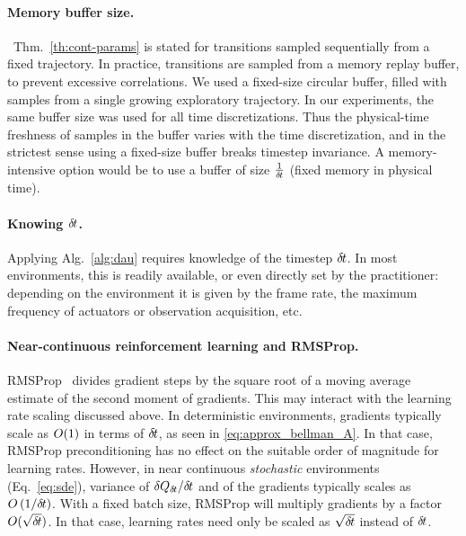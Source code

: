 \paragraph{Memory buffer size.}~Thm.~\ref{th:cont-params} is stated for
transitions sampled sequentially from a fixed trajectory. In practice,
transitions are sampled from a memory replay buffer, to prevent excessive correlations.
We used a fixed-size circular buffer, filled
with samples from a single growing exploratory trajectory. In
our experiments, the same buffer size was used for all time discretizations. 
Thus the physical-time freshness of samples in the buffer varies with the
time discretization, and in the strictest sense using a fixed-size buffer
breaks timestep invariance. A memory-intensive option would be to use a
buffer of size $\frac{1}{{\delta\hspace{-.1em}t}}$ (fixed memory in physical time).

\paragraph{Knowing ${\delta\hspace{-.1em}t}$.} Applying Alg.~\ref{alg:dau} requires
knowledge of the timestep ${\delta\hspace{-.1em}t}$. In most environments, this is
readily available, or even directly set by the practitioner: depending on
the environment it is given by the frame rate, the maximum frequency of
actuators or observation acquisition, etc. 

\paragraph{Near-continuous reinforcement learning and RMSProp.}
RMSProp~\cite{rmsprop} divides gradient steps by the square root of a
moving average estimate of the second moment of gradients.
This may interact with the learning rate scaling discussed above. In
deterministic environments, gradients typically scale as $O(1)$ in
terms of ${\delta\hspace{-.1em}t}$, as seen in \eqref{eq:approx_bellman_A}.  In that case, RMSProp
preconditioning has no effect on the suitable order of magnitude for learning
rates. However, in near continuous \emph{stochastic} environments
(Eq.~\ref{eq:sde}), variance of $\delta
Q_{{\delta\hspace{-.1em}t}}/{\delta\hspace{-.1em}t}$ and of the gradients typically scales as
$O\left(1/{\delta\hspace{-.1em}t}\right)$. With a fixed batch size,
RMSProp will multiply gradients by a factor $O(\sqrt{{\delta\hspace{-.1em}t}})$. In
that case,
learning rates need only be scaled as $\sqrt{{\delta\hspace{-.1em}t}}$ instead of
${\delta\hspace{-.1em}t}$.

